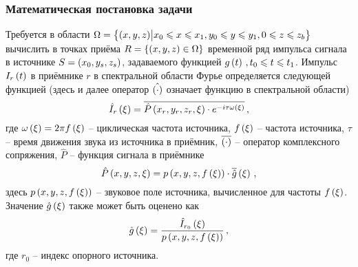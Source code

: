 \documentclass[../document.tex]{subfiles}
\begin{document}
			\subsubsection{Математическая постановка задачи}
				\par Требуется в области $\Omega=\left\{\left(x,y,z\right)\bigr|x_0\leqslant x\leqslant x_1,y_0\leqslant y\leqslant y_1,0\leqslant z\leqslant z_b\right\}$ вычислить в точках приёма $R=\left\{\left(x,y,z\right)\in\Omega\right\}$ временной ряд импульса сигнала в источнике $S=\left(x_0, y_s, z_s\right)$, задаваемого функцией $g\left(t\right)\,,t_0\leqslant t\leqslant t_1$. Импульс $I_r\left(t\right)$ в приёмнике $r$ в спектральной области Фурье определяется следующей функцией (здесь и далее оператор $\hat{\left(\cdot\right)}$ означает функцию в спектральной области)
				\begin{equation}
					\hat{I}_r\left(\xi\right)=\overline{\hat{P}\left(x_r,y_r,z_r, \xi\right)\cdot e^{-i\tau\omega\left(\xi\right)}}\,,
				\end{equation}
				где $\omega\left(\xi\right)=2\pi f\left(\xi\right)$ -- циклическая частота источника, $f\left(\xi\right)$ -- частота источника, $\tau$ -- время движения звука из источника в приёмник, $\overline{\left(\cdot\right)}$ -- оператор комплексного сопряжения, $\hat{P}$ -- функция сигнала в приёмнике
				\begin{equation}\label{eq::receiver_signal}
					\hat{P}\left(x,y,z,\xi\right)=p\left(x,y,z,f\left(\xi\right)\right)\cdot\overline{\hat{g}}\left(\xi\right)\,,
				\end{equation}
				здесь $p\left(x,y,z,f\left(\xi\right)\right)$ -- звуковое поле источника, вычисленное для частоты $f\left(\xi\right)$. Значение $\hat{g}\left(\xi\right)$ также может быть оценено как
                \begin{equation}\label{eq::ref}
                    \hat{g}\left(\xi\right)=\frac{\hat{I}_{r_0}\left(\xi\right)}{p\left(x,y,z,f\left(\xi\right)\right)}\,,
                \end{equation}
                где $r_0$ -- индекс опорного источника.
\end{document}
